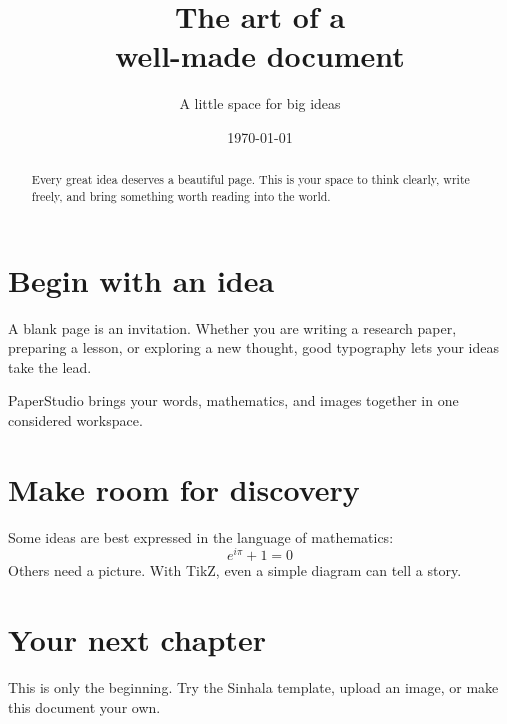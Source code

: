 \documentclass[11pt,a4paper]{article}
\title{\color{forest}\Huge The art of a\\well-made document}
\author{A little space for big ideas}
\date{\today}
\begin{document}
\maketitle
\thispagestyle{empty}

\begin{abstract}
Every great idea deserves a beautiful page. This is your
space to think clearly, write freely, and bring something
worth reading into the world.
\end{abstract}

\section{Begin with an idea}
A blank page is an invitation. Whether you are writing a
research paper, preparing a lesson, or exploring a new
thought, good typography lets your ideas take the lead.

PaperStudio brings your words, mathematics, and images
together in one considered workspace.

\section{Make room for discovery}
Some ideas are best expressed in the language of mathematics:
\begin{equation}
  e^{i\pi} + 1 = 0
\end{equation}
Others need a picture. With TikZ, even a simple diagram
can tell a story.

\begin{center}
\end{center}

\section{Your next chapter}
This is only the beginning. Try the Sinhala template,
upload an image, or make this document your own.
\end{document}
